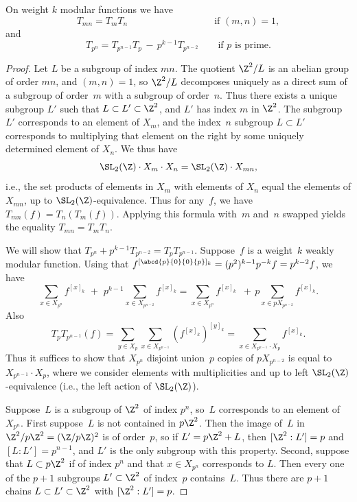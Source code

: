 \begin{proposition}\label{prop:hecke_com}
On weight $k$ modular functions we have
\begin{equation}\label{eqn:hecke_mul}
  T_{mn} = T_{m} T_{n} \qquad\qquad\qquad\qquad\quad
 \text{if }(m,n)=1,
\end{equation}
and
\begin{equation}\label{eqn:hecke_recur}
  T_{p^n} = T_{p^{n-1}} T_p\, -\, p^{k-1} T_{p^{n-2}} \qquad\!\!
\text{if $p$ is prime}.
\end{equation}
\end{proposition}
\begin{proof}
  Let $L$ be a subgroup of index $mn$.  The quotient $\Z^2/L$ is an
  abelian group of order $mn$, and $(m,n)=1$, so $\Z^2/L$ decomposes
  uniquely as a direct sum of a subgroup of order~$m$ with a subgroup of
  order~$n$.  Thus there exists a unique subgroup $L'$ such that
  $L\subset L'\subset \Z^2$, and $L'$ has index $m$ in $\Z^2$.  The
  subgroup $L'$ corresponds to an element of $X_m$, and the index~$n$
  subgroup $L\subset L'$ corresponds to multiplying that element on
  the right by some uniquely determined element of $X_n$.  We thus
  have $$ \SL_2(\Z) \cdot X_{m} \cdot X_n = \SL_2(\Z) \cdot X_{mn}, $$
  i.e., the set products of elements in $X_m$ with elements of $X_n$
  equal the elements of $X_{mn}$, up to $\SL_2(\Z)$-equivalence. 
  Thus for any~$f$, we have
  $T_{mn}(f) = T_{n}(T_m(f))$.  Applying this formula with~$m$ and~$n$
  swapped yields the equality $T_{mn} = T_{m} T_{n}$.

  We will show that $T_{p^n} + p^{k-1} T_{p^{n-2}} = T_p T_{p^{n-1}}$.
  Suppose~$f$ is a weight~$k$ weakly modular function.  
Using that $f^{[\abcd{p}{0}{0}{p}]_k} 
   = (p^2)^{k-1}p^{-k} f = p^{k-2} f$, we have
$$
 \sum_{x\in X_{p^n}} f^{[x]_k}\,\, +\,\, p^{k-1}\!\!\! \sum_{x\in
      X_{p^{n-2}}} f^{[x]_k}
   =  \sum_{x\in X_{p^n}} f^{[x]_k} \,\,\,+\, p\!\!\!\! \sum_{x\in pX_{p^{n-2}}} 
  f^{[x]_k}.
$$
Also $$T_p T_{p^{n-1}}(f) = \sum_{y\in X_p} \sum_{x\in X_{p^{n-1}}}
(f^{[x]_k})^{[y]_k} = \sum_{x \in X_{p^{n-1}}\cdot X_p} f^{[x]_k}. $$ Thus it
suffices to show that $X_{p^n}$ disjoint union~$p$ copies of $p X_{p^{n-2}}$ is
equal to $X_{p^{n-1}}\cdot X_p$, where we consider elements with
multiplicities and up to left $\SL_2(\Z)$-equivalence (i.e., the left
action of $\SL_2(\Z)$).

  Suppose~$L$ is a subgroup of $\Z^2$ of index $p^n$, so~$L$
  corresponds to an element of $X_{p^n}$.  First suppose~$L$ is not
  contained in $p\Z^2$.  Then the image of~$L$ in $\Z^2/p\Z^2 =
  (\Z/p\Z)^2$ is of order~$p$, so if $L'=p\Z^2 + L$, then
  $[\Z^2:L']=p$ and $[L:L']=p^{n-1}$, and $L'$ is the only subgroup
  with this property.  Second, suppose that $L\subset p\Z^2$ if of
  index $p^n$ and that $x\in X_{p^n}$ corresponds to $L$.  Then every
  one of the $p+1$ subgroups $L'\subset \Z^2$ of index~$p$
  contains~$L$. Thus there are $p+1$ chains $L\subset L'\subset \Z^2$
with $[\Z^2:L']=p$.


\end{proof}

